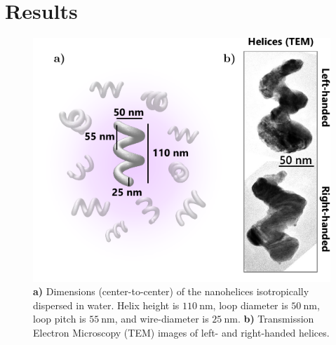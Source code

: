 \section{Results}

\begin{figure}[htb!]	
    \centering	
    \includegraphics[scale=1]{./figures/results/HRS/sample_schematic.pdf}
    \caption{\label{fig:results:HRS:sample_schematic}
    \textbf{a)} Dimensions (center-to-center) of the nanohelices isotropically dispersed in water. Helix height is $\SI{110}{\nano\m}$, loop diameter is $\SI{50}{\nano\m}$, loop pitch is $\SI{55}{\nano\m}$, and wire-diameter is $\SI{25}{\nano\m}$. \textbf{b)} Transmission Electron Microscopy (TEM) images of left- and right-handed helices. }	
\end{figure}


